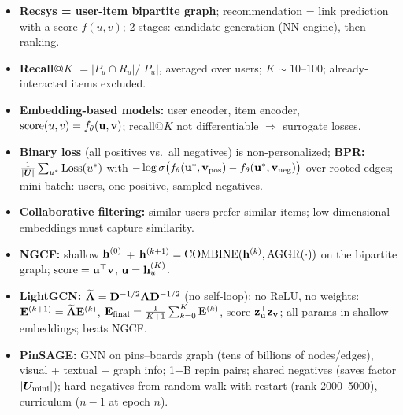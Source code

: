 \par\ifdim\dimexpr\pagegoal-\pagetotal\relax<11cm\relax\newpage\fi
\bigskip{}
{}
\begin{summarybox}
  \begin{itemize}
    \item \textbf{Recsys = user-item bipartite graph}; recommendation = link
      prediction with a score $f(u,v)$; 2 stages: candidate generation (NN
      engine), then ranking.
    \item \textbf{Recall@$K$} $=|P_u\cap R_u|/|P_u|$, averaged over users;
      $K\sim10$--$100$; already-interacted items excluded.
    \item \textbf{Embedding-based models:} user encoder, item encoder,
      $\mathrm{score}(u,v)=f_\theta(\mathbf{u},\mathbf{v})$; recall@$K$ not differentiable
      $\Rightarrow$ surrogate losses.
    \item \textbf{Binary loss} (all positives vs.\ all negatives) is
      non-personalized; \textbf{BPR:}
      $\frac{1}{|\bm{U}|}\sum_{u^*}\mathrm{Loss}(u^*)$ with
      $-\log\sigma\big(f_\theta(\mathbf{u}^*,\mathbf{v}_{\mathrm{pos}})-f_\theta(\mathbf{u}^*,\mathbf{v}_{\mathrm{neg}})\big)$ over
      rooted edges; mini-batch: users, one positive, sampled negatives.
    \item \textbf{Collaborative filtering:} similar users prefer similar items;
      low-dimensional embeddings must capture similarity.
    \item \textbf{NGCF:} shallow $\mathbf{h}^{(0)}$ +
      $\mathbf{h}^{(k+1)}=\mathrm{COMBINE}(\mathbf{h}^{(k)},\mathrm{AGGR}(\cdot))$ on the
      bipartite graph; $\mathrm{score}=\mathbf{u}^{\top}\mathbf{v}$, $\mathbf{u}=\mathbf{h}_u^{(K)}$.
    \item \textbf{LightGCN:} $\widetilde{\mathbf{A}}=\mathbf{D}^{-1/2}\mathbf{A}\mathbf{D}^{-1/2}$ (no self-loop); no
      ReLU, no weights: $\mathbf{E}^{(k+1)}=\widetilde{\mathbf{A}}\mathbf{E}^{(k)}$,
      $\mathbf{E}_{\mathrm{final}}=\frac{1}{K+1}\sum_{k=0}^K\mathbf{E}^{(k)}$, score
      $\mathbf{z}_{\mathbf{u}}^{\top}\mathbf{z}_{\mathbf{v}}$; all params in shallow embeddings; beats NGCF.
    \item \textbf{PinSAGE:} GNN on pins--boards graph (tens of billions of
      nodes/edges), visual + textual + graph info; 1+B repin pairs; shared
      negatives (saves factor $|\bm{U}_{\mathrm{mini}}|$); hard negatives from random walk with
      restart (rank 2000--5000), curriculum ($n-1$ at epoch $n$).
  \end{itemize}
\end{summarybox}

